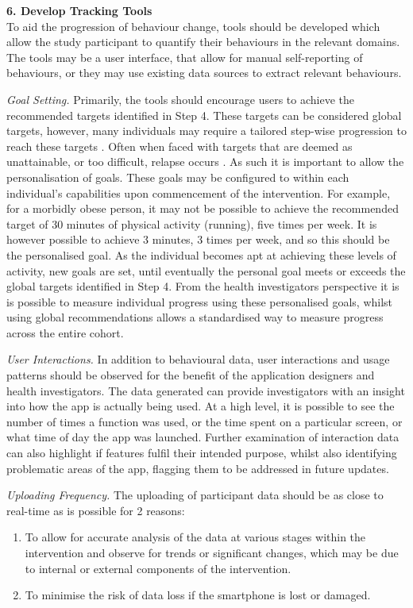 \textbf{6. Develop Tracking Tools} \\
To aid the progression of behaviour change, tools should be developed which allow the study participant to quantify their behaviours in the relevant domains. The tools may be a user interface, that allow for manual self-reporting of behaviours, or they may use existing data sources to extract relevant behaviours.

\textit{Goal Setting.} Primarily, the tools should encourage users to achieve the recommended targets identified in Step 4. These targets can be considered global targets, however, many individuals may require a tailored step-wise progression to reach these targets \cite{Prochaska2013}. Often when faced with targets that are deemed as unattainable, or too difficult, relapse occurs \cite{Velicer1995, Prochaska2005}. As such it is important to allow the personalisation of goals. These goals may be configured to within each individual's capabilities upon commencement of the intervention. For example, for a morbidly obese person, it may not be possible to achieve the recommended target of 30 minutes of physical activity (running), five times per week. It is however possible to achieve 3 minutes, 3 times per week, and so this should be the personalised goal. As the individual becomes apt at achieving these levels of activity, new goals are set, until eventually the personal goal meets or exceeds the global targets identified in Step 4.
From the health investigators perspective it is is possible to measure individual progress using these personalised goals, whilst using global recommendations allows a standardised way to measure progress across the entire cohort.

\textit{User Interactions.} In addition to behavioural data, user interactions and usage patterns should be observed for the benefit of the application designers and health investigators. The data generated can provide investigators with an insight into how the app is actually being used. At a high level, it is possible to see the number of times a function was used, or the time spent on a particular screen, or what time of day the app was launched. Further examination of interaction data can also highlight if features fulfil their intended purpose, whilst also identifying problematic areas of the app, flagging them to be addressed in future updates.

\textit{Uploading Frequency.} The uploading of participant data should be as close to real-time as is possible for 2 reasons:
\begin{enumerate}[noitemsep,topsep=0pt]
\item To allow for accurate analysis of the data at various stages within the intervention and observe for trends or significant changes, which may be due to internal or external components of the intervention.
\item To minimise the risk of data loss if the smartphone is lost or damaged.
\end{enumerate}

